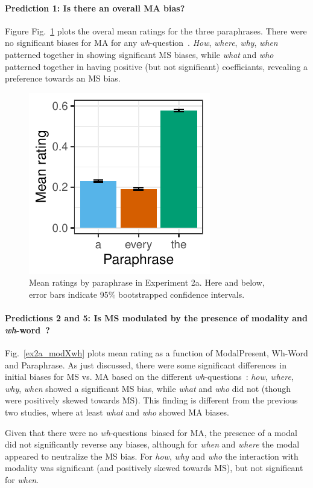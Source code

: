 \documentclass[12pt,letterpaper,table,svgnames,dvipsnames]{article}
\newcommand{\figref}[1]{Fig.~\ref{#1}}
\newcommand{\whq}{\emph{wh}-question~}
\newcommand{\whqs}{\emph{wh}-questions~}
\newcommand{\whw}{\emph{wh}-word~}
\begin{document}
\paragraph{Prediction 1: Is there an overall MA bias?}

Figure \figref{ex2a_overall} plots the overal mean ratings for the three paraphrases. There were no significant biases for MA for any \whq. \emph{How}, \emph{where}, \emph{why}, \emph{when} patterned together in showing significant MS biases, while \emph{what} and \emph{who} patterned together in having positive (but not significant) coefficiants, revealing a preference towards an MS bias.
\begin{figure}[h!]
\centering
\includegraphics[scale=1]{figures/overall_nocontext_root.pdf}
\caption{Mean ratings by paraphrase in Experiment 2a. Here and below, error bars indicate 95\% bootstrapped confidence intervals.}
\label{ex2a_overall}
\end{figure}


\paragraph{Predictions 2 and 5: Is MS modulated by the presence of modality and \whw?}
\figref{ex2a_modXwh} plots mean rating as a function of ModalPresent, Wh-Word and Paraphrase. As just discussed, there were some significant differences in initial biases for MS vs. MA based on the different \whqs: \emph{how}, \emph{where}, \emph{why}, \emph{when} showed a significant MS bias, while \emph{what} and \emph{who} did not (though were positively skewed towards MS). This finding is different from the previous two studies, where at least \emph{what} and \emph{who} showed MA biases.

Given that there were no \whqs biased for MA, the presence of a modal did not significantly reverse any biases, although for \emph{when} and \emph{where} the modal appeared to neutralize the MS bias. For \emph{how}, \emph{why} and \emph{who} the interaction with modality was significant (and positively skewed towards MS), but not significant for \emph{when}.
\end{document}
